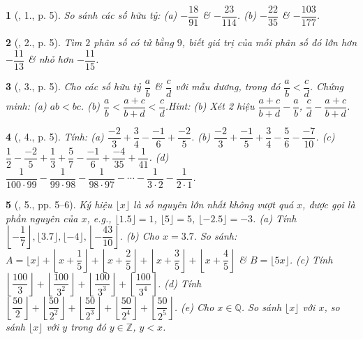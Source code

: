 \documentclass{article}
\newtheorem{baitoan}{}
\begin{document}
\begin{baitoan}[\cite{Binh_Toan_7_tap_1}, 1., p. 5]
	So sánh các số hữu tỷ: (a) $-\dfrac{18}{91}$ \& $-\dfrac{23}{114}$. (b) $-\dfrac{22}{35}$ \& $-\dfrac{103}{177}$.
\end{baitoan}

\begin{baitoan}[\cite{Binh_Toan_7_tap_1}, 2., p. 5]
	Tìm $2$ phân số có tử bằng $9$, biết giá trị của mỗi phân số đó lớn hơn $-\dfrac{11}{13}$ \& nhỏ hơn $-\dfrac{11}{15}$.
\end{baitoan}

\begin{baitoan}[\cite{Binh_Toan_7_tap_1}, 3., p. 5]
	Cho các số hữu tỷ $\dfrac{a}{b}$ \& $\dfrac{c}{d}$ với mẫu dương, trong đó $\dfrac{a}{b} < \dfrac{c}{d}$. Chứng minh: (a) $ab < bc$. (b) $\dfrac{a}{b} < \dfrac{a + c}{b + d} < \dfrac{c}{d}$.\hfill{\sf Hint: (b) Xét 2 hiệu $\dfrac{a + c}{b + d} - \dfrac{a}{b}$, $\dfrac{c}{d} - \dfrac{a + c}{b + d}$.}
\end{baitoan}

\begin{baitoan}[\cite{Binh_Toan_7_tap_1}, 4., p. 5]
	Tính: (a) $\dfrac{-2}{3} + \dfrac{3}{4} - \dfrac{-1}{6} + \dfrac{-2}{5}$. (b) $\dfrac{-2}{3} + \dfrac{-1}{5} + \dfrac{3}{4} - \dfrac{5}{6} - \dfrac{-7}{10}$. (c) $\dfrac{1}{2} - \dfrac{-2}{5} + \dfrac{1}{3} + \dfrac{5}{7} - \dfrac{-1}{6} + \dfrac{-4}{35} + \dfrac{1}{41}$. (d) $\dfrac{1}{100\cdot 99} - \dfrac{1}{99\cdot 98} - \dfrac{1}{98\cdot 97} - \cdots - \dfrac{1}{3\cdot 2} - \dfrac{1}{2\cdot 1}$.
\end{baitoan}

\begin{baitoan}[\cite{Binh_Toan_7_tap_1}, 5., pp. 5--6]
	Ký hiệu $\lfloor x\rfloor$ là số nguyên lớn nhất không vượt quá $x$, được gọi là \emph{phần nguyên} của $x$, e.g., $\lfloor 1.5\rfloor = 1$, $\lfloor 5\rfloor = 5$, $\lfloor -2.5\rfloor = -3$. (a) Tính $\left\lfloor-\dfrac{1}{7}\right\rfloor,\lfloor 3.7\rfloor,\lfloor-4\rfloor,\left\lfloor-\dfrac{43}{10}\right\rfloor$. (b) Cho $x = 3.7$. So sánh: $A = \lfloor x\rfloor + \left\lfloor x + \dfrac{1}{5}\right\rfloor + \left\lfloor x + \dfrac{2}{5}\right\rfloor + \left\lfloor x + \dfrac{3}{5}\right\rfloor + \left\lfloor x + \dfrac{4}{5}\right\rfloor$ \& $B = \lfloor 5x\rfloor$. (c) Tính $ \left\lfloor\dfrac{100}{3}\right\rfloor + \left\lfloor\dfrac{100}{3^2}\right\rfloor + \left\lfloor\dfrac{100}{3^3}\right\rfloor + \left\lfloor\dfrac{100}{3^4}\right\rfloor$. (d) Tính $\left\lfloor\dfrac{50}{2}\right\rfloor + \left\lfloor\dfrac{50}{2^2}\right\rfloor + \left\lfloor\dfrac{50}{2^3}\right\rfloor + \left\lfloor\dfrac{50}{2^4}\right\rfloor + \left\lfloor\dfrac{50}{2^5}\right\rfloor$.  (e) Cho $x\in\mathbb{Q}$. So sánh $\lfloor x\rfloor$ với $x$, so sánh $\lfloor x\rfloor$ với $y$ trong đó $y\in\mathbb{Z}$, $y < x$.
\end{baitoan}
\end{document}
